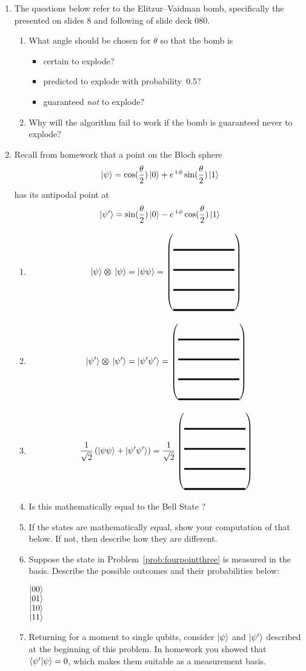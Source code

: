 \documentclass[12pt]{article}
\def\TwoQBlank{%
\DQB{\Blank}{\Blank}{\Blank}{\Blank}%
}
\begin{document}
\begin{enumerate}
\begin{enumerate}[label=\theenumi.\arabic*]
    \LeaveSpace[2in]{}
\end{enumerate}
\item The questions below refer to the Elitzur--Vaidman bomb, specifically the  presented on slides 8 and following of slide deck 080.
\begin{enumerate}[label=\theenumi.\arabic*]
  \item What angle should be chosen for $\theta$ so that the bomb is
  \begin{itemize}
      \item certain to explode?\Blank{}
      \item predicted to explode with probability~0.5?\Blank{}
  \item guaranteed \emph{not} to explode?\Blank{}
  \end{itemize}
  \item Why will the algorithm fail to work if the bomb is guaranteed never to explode?\LeaveSpace{}
\end{enumerate}

\item Recall from homework that a point on the Bloch sphere
\[
\ket{\psi} = \cos(\frac{\theta}{2})\ket{0}
    + e^{\,\kern 0.5pt\mathfrak{i}\,\phi}\sin(\frac{\theta}{2})\ket{1}
\]
has its antipodal point at
        \[
        \ket{\psi'}= \sin({\frac{\theta}{2})\ket{0}-e^{\,\kern 0.5pt\mathfrak{i}\,\phi}\cos({\frac{\theta}{2}})\ket{1}}
        \]
\begin{enumerate}[label=\theenumi.\arabic*]
\item \[
\TensProd{\ket{\psi}}{\ket{\psi}} = \ket{\psi\psi} = \TwoQBlank{}
\]
\item \[
\TensProd{\ket{\psi'}}{\ket{\psi'}} = \ket{\psi'\psi'} = \TwoQBlank{}
\]
\item\label{prob:fourpointthree}
\[
\TwoSup{\psi\psi}{\psi'\psi'} = \RootTwo{}\TwoQBlank{}
\]
\item Is this mathematically equal to the Bell State ? \Blank{}
\item If the states are mathematically equal, show your computation of that below.  If not, then describe how they are different.
\LeaveSpace{}
\item Suppose the state in Problem~\ref{prob:fourpointthree} is measured in the \TensProd{\PauliZ}{\PauliZ} basis.  Describe the possible outcomes and their probabilities below:
\begin{description}
    \item[$\ket{00}$] \Blank[3in]{}
    \item[$\ket{01}$] \Blank[3in]{}
    \item[$\ket{10}$] \Blank[3in]{}
    \item[$\ket{11}$] \Blank[3in]{}
\end{description}
\item\label{prob:matrix} Returning for a moment to single qubits, consider $\ket{\psi}$ and $\ket{\psi'}$ described at the beginning of this problem. In homework you showed that $\braket{\psi'|\psi}=0$, which makes them suitable as a measurement basis.


\end{enumerate}
\end{enumerate}
\end{document}
